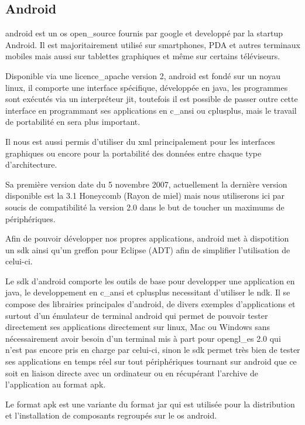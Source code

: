 \subsection{Android}

	\gls{android} est un \gls{os} \gls{open_source} fournis par \gls{google} et
	developpé par la startup Android.
	Il est majoritairement utilisé sur smartphones, PDA et autres terminaux
	mobiles mais aussi sur tablettes graphiques et même sur certains téléviseurs.
	
	Disponible via une \gls{licence_apache} version 2, \gls{android} est fondé  sur
	un noyau \gls{linux}, il comporte une interface spécifique, développée en \gls{java},
	les programmes sont exécutés via un interpréteur \gls{jit}, toutefois il est possible
	de passer outre cette interface en programmant ses applications en \gls{c_ansi} ou \gls{cplusplus},
	mais le travail de portabilité en sera plus important.
	
	Il nous est aussi permis d'utiliser du \gls{xml} principalement pour les interfaces
	graphiques ou encore pour la portabilité des données entre chaque type
	d'architecture.
	
	Sa première version date du 5 novembre 2007, actuellement la dernière version
	disponible est la 3.1 Honeycomb (Rayon de miel) mais nous utiliserons ici par
	soucis de compatibilité la version 2.0 dans le but de toucher un maximums de
	périphériques.
	
	Afin de pouvoir développer nos propres applications, \gls{android} met à
	dispotition un \gls{sdk} ainsi qu'un greffon pour Eclipse
	(ADT) afin de simplifier l'utilisation de celui-ci.
	
	Le \gls{sdk} d'\gls{android} comporte les outils de base pour developper une application en
	\gls{java}, le developpement en \gls{c_ansi} et \gls{cplusplus} necessitant d'utiliser le \gls{ndk}.
	Il se compose des librairies principales d'\gls{android}, de divers exemples
	d'applications et surtout d'un émulateur de terminal \gls{android} qui permet de
	pouvoir tester directement ses applications directement sur \gls{linux}, Mac ou
	Windows sans nécessairement avoir besoin d'un terminal mis à part pour
	\gls{opengl_es} 2.0 qui n'est pas encore pris en charge par celui-ci, sinon le \gls{sdk}
	permet très bien de tester ses applications en temps réel sur tout
	périphériques tournant sur \gls{android} que ce soit en liaison directe avec un
	ordinateur ou en récupérant l'archive de l'application au format \gls{apk}.
	
	Le format \gls{apk} est une variante du format
	\gls{jar} qui est utilisée pour la distribution et l'installation de composants
	regroupés sur le \gls{os} \gls{android}.


